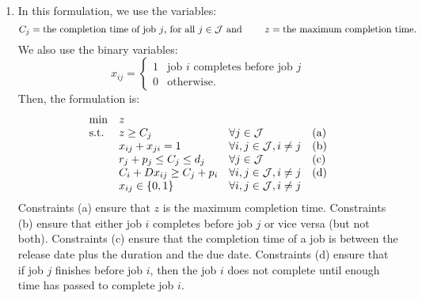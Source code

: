 \documentclass[10pt]{article}
\begin{document}
\begin{enumerate}
\begin{enumerate}
  \item In this formulation, we use the variables:
    \[
    C_j = \mbox{the completion time of job $j$, for all $j \in {\cal J}$ and } \quad \quad
    z = \mbox{the maximum completion time}.
    \]
    We also use the binary variables:
    \[
    x_{ij} = \left\{
      \begin{array}{ll}
        1 & \mbox{job $i$ completes before job $j$} \\
        0 & \mbox{otherwise}.
      \end{array}
      \right.
    \]
    Then, the formulation is:
    \[
    \begin{array}{llll}
      \min & z & & \\
      \mbox{s.t.}
      & z \geq C_j & \forall j \in {\cal J} & \mbox{(a)} \\
      & x_{ij} + x_{ji} = 1 & \forall i,j \in {\cal J}, i \ne j & \mbox{(b)} \\
      & r_j + p_j \leq C_j \leq d_j & \forall j \in {\cal J} & \mbox{(c)} \\
      & C_i + D x_{ij} \geq C_j + p_i & \forall i,j \in {\cal J}, i \ne j & \mbox{(d)} \\
      & x_{ij} \in \{0,1\} & \forall i,j \in {\cal J}, i \ne j & 
    \end{array}
    \]
    Constraints (a) ensure that $z$ is the maximum completion
    time. Constraints (b) ensure that either job $i$ completes before
    job $j$ or vice versa (but not both). Constraints (c) ensure that
    the completion time of a job is between the release date plus the
    duration and the due date. Constraints (d) ensure that if job $j$
    finishes before job $i$, then the job $i$ does not complete until
    enough time has passed to complete job $i$.


\end{enumerate}
\end{enumerate}
\end{document}
